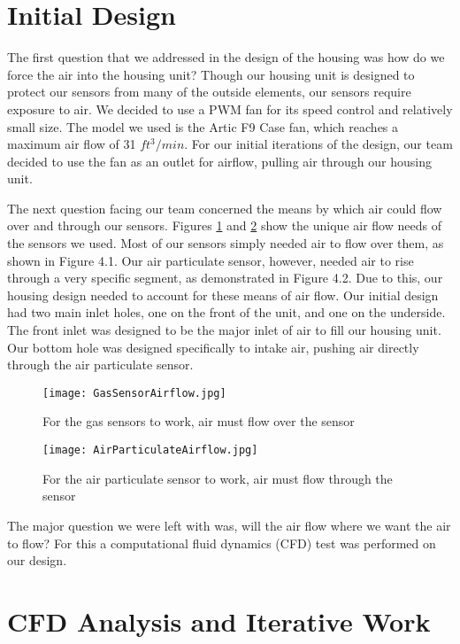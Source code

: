\section{Initial Design}

The first question that we addressed in the design of the housing was how do we force the air into the housing unit? Though our housing unit is designed to protect our sensors from many of the outside elements, our sensors require exposure to air. We decided to use a PWM fan for its speed control and relatively small size. The model we used is the Artic F9 Case fan, which reaches a maximum air flow of 31 $ft^{3}/min$. For our initial iterations of the design, our team decided to use the fan as an outlet for airflow, pulling air through our housing unit.

The next question facing our team concerned the means by which air could flow over and through our sensors. Figures \ref{fig:airflow1} and \ref{fig:airflow2} show the unique air flow needs of the sensors we used. Most of our sensors simply needed air to flow over them, as shown in Figure 4.1. Our air particulate sensor, however, needed air to rise through a very specific segment, as demonstrated in Figure 4.2. Due to this, our housing design needed to account for these means of air flow.  Our initial design had two main inlet holes, one on the front of the unit, and one on the underside. The front inlet was designed to be the major inlet of air to fill  our housing unit. Our bottom hole was designed specifically to intake air, pushing air directly through the air particulate sensor.

\begin{figure}[H]
	\centering
	\texttt{[image: GasSensorAirflow.jpg]}
	\caption{For the gas sensors to work, air must flow over the sensor}
	\label{fig:airflow1}
\end{figure}

\begin{figure}[H]
	\centering
	\texttt{[image: AirParticulateAirflow.jpg]}
	\caption{For the air particulate sensor to work, air must flow through the sensor}
	\label{fig:airflow2}
\end{figure}

The major question we were left with was, will the air flow where we want the air to flow? For this a computational fluid dynamics (CFD) test was performed on our design.

\section{CFD Analysis and Iterative Work}

